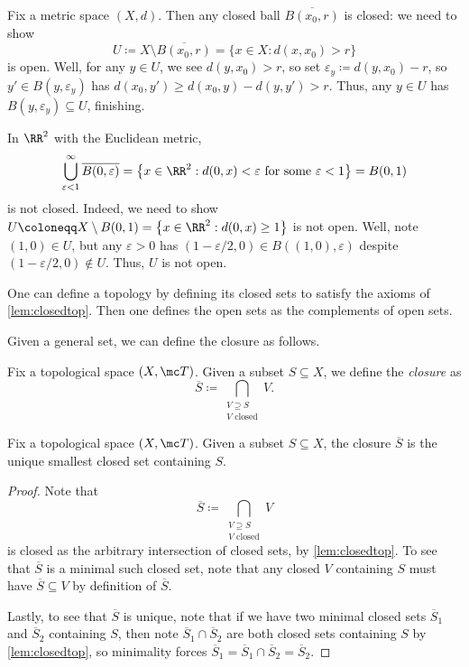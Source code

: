 \documentclass[../notes.tex]{subfiles}
\begin{document}
\begin{example}
	Fix a metric space $(X,d)$. Then any closed ball $\overline{B(x_0,r)}$ is closed: we need to show
	\[U\coloneqq X\setminus\overline{B(x_0,r)}=\{x\in X:d(x,x_0)>r\}\]
	is open. Well, for any $y\in U$, we see $d(y,x_0)>r$, so set $\varepsilon_y\coloneqq d(y,x_0)-r$, so $y'\in B(y,\varepsilon_y)$ has $d(x_0,y')\ge d(x_0,y)-d(y,y')>r$. Thus, any $y\in U$ has $B(y,\varepsilon_y)\subseteq U$, finishing.
\end{example}
\begin{remark}
	In $\RR^2$ with the Euclidean metric,
	\[\bigcup_{\varepsilon<1}^\infty\overline{B(0,\varepsilon)}=\left\{x\in\RR^2:d(0,x)<\varepsilon\text{ for some }\varepsilon<1\right\}=B(0,1)\]
	is not closed. Indeed, we need to show $U\coloneqq X\setminus B(0,1)=\left\{x\in\RR^2:d(0,x)\ge1\right\}$ is not open. Well, note $(1,0)\in U$, but any $\varepsilon>0$ has $(1-\varepsilon/2,0)\in B((1,0),\varepsilon)$ despite $(1-\varepsilon/2,0)\notin U$. Thus, $U$ is not open.
\end{remark}
\begin{remark}
	One can define a topology by defining its closed sets to satisfy the axioms of \autoref{lem:closedtop}. Then one defines the open sets as the complements of open sets.
\end{remark}
Given a general set, we can define the closure as follows.
\begin{definition}
	Fix a topological space $(X,\mc T)$. Given a subset $S\subseteq X$, we define the \textit{closure} as
	\[\overline S\coloneqq\bigcap_{\substack{V\supseteq S\\V\text{ closed}}}V.\]
\end{definition}
\begin{lemma}
	Fix a topological space $(X,\mc T)$. Given a subset $S\subseteq X$, the closure $\overline S$ is the unique smallest closed set containing $S$.
\end{lemma}
\begin{proof}
	Note that
	\[\overline S\coloneqq\bigcap_{\substack{V\supseteq S\\V\text{ closed}}}V\]
	is closed as the arbitrary intersection of closed sets, by \autoref{lem:closedtop}. To see that $\overline S$ is a minimal such closed set, note that any closed $V$ containing $S$ must have $\overline S\subseteq V$ by definition of $\overline S$.
	
	Lastly, to see that $\overline S$ is unique, note that if we have two minimal closed sets $\overline S_1$ and $\overline S_2$ containing $S$, then note $\overline S_1\cap\overline S_2$ are both closed sets containing $S$ by \autoref{lem:closedtop}, so minimality forces $\overline S_1=\overline S_1\cap\overline S_2=\overline S_2$.
\end{proof}
\end{document}
